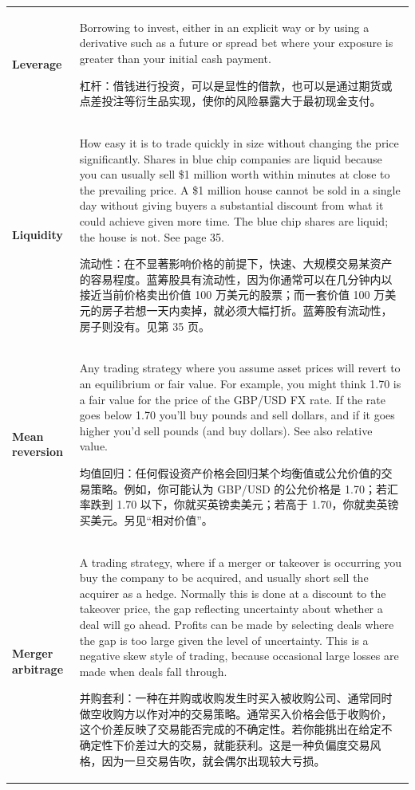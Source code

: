 \begin{chinesetableblock}
{\begin{longtable}{@{}>{\raggedright\arraybackslash\bfseries} p{}>{\raggedright\arraybackslash} p{}@{}}
Leverage & Borrowing to invest, either in an explicit way or by using a derivative such as a future or spread bet where your exposure is greater than your initial cash payment. \par 杠杆：借钱进行投资，可以是显性的借款，也可以是通过期货或点差投注等衍生品实现，使你的风险暴露大于最初现金支付。 \\[0.65em]
Liquidity & How easy it is to trade quickly in size without changing the price significantly. Shares in blue chip companies are liquid because you can usually sell \$1 million worth within minutes at close to the prevailing price. A \$1 million house cannot be sold in a single day without giving buyers a substantial discount from what it could achieve given more time. The blue chip shares are liquid; the house is not. See page 35. \par 流动性：在不显著影响价格的前提下，快速、大规模交易某资产的容易程度。蓝筹股具有流动性，因为你通常可以在几分钟内以接近当前价格卖出价值 100 万美元的股票；而一套价值 100 万美元的房子若想一天内卖掉，就必须大幅打折。蓝筹股有流动性，房子则没有。见第 35 页。 \\[0.65em]
Mean reversion & Any trading strategy where you assume asset prices will revert to an equilibrium or fair value. For example, you might think 1.70 is a fair value for the price of the GBP/USD FX rate. If the rate goes below 1.70 you’ll buy pounds and sell dollars, and if it goes higher you’d sell pounds (and buy dollars). See also relative value. \par 均值回归：任何假设资产价格会回归某个均衡值或公允价值的交易策略。例如，你可能认为 GBP/USD 的公允价格是 1.70；若汇率跌到 1.70 以下，你就买英镑卖美元；若高于 1.70，你就卖英镑买美元。另见“相对价值”。 \\[0.65em]
Merger arbitrage & A trading strategy, where if a merger or takeover is occurring you buy the company to be acquired, and usually short sell the acquirer as a hedge. Normally this is done at a discount to the takeover price, the gap reflecting uncertainty about whether a deal will go ahead. Profits can be made by selecting deals where the gap is too large given the level of uncertainty. This is a negative skew style of trading, because occasional large losses are made when deals fall through. \par 并购套利：一种在并购或收购发生时买入被收购公司、通常同时做空收购方以作对冲的交易策略。通常买入价格会低于收购价，这个价差反映了交易能否完成的不确定性。若你能挑出在给定不确定性下价差过大的交易，就能获利。这是一种负偏度交易风格，因为一旦交易告吹，就会偶尔出现较大亏损。 \\[0.65em]

\end{longtable}}
\end{chinesetableblock}
